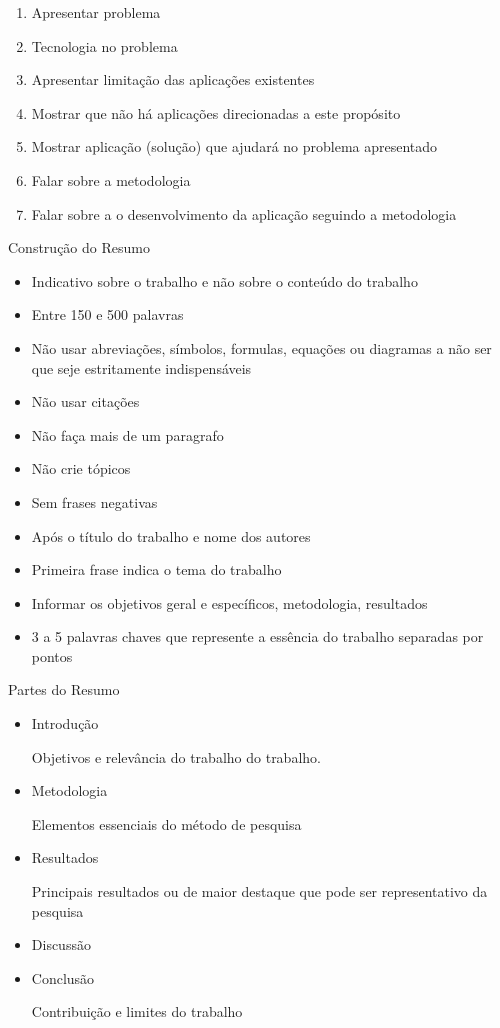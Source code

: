 \begin{enumerate}
\item Apresentar problema
\item Tecnologia no problema
\item Apresentar limitação das aplicações existentes
\item Mostrar que não há aplicações direcionadas a este propósito
\item Mostrar aplicação (solução) que ajudará no problema apresentado
\item Falar sobre a metodologia
\item Falar sobre a o desenvolvimento da aplicação seguindo a metodologia
\end{enumerate}


\newpage
{\fontsize{17}{0}\selectfont Construção do Resumo}
\begin{itemize}
\item Indicativo sobre o trabalho e não sobre o conteúdo do trabalho
\item Entre 150 e 500 palavras
\item Não usar abreviações, símbolos, formulas, equações ou diagramas a não ser que seje estritamente indispensáveis
\item Não usar citações
\item Não faça mais de um paragrafo
\item Não crie tópicos
\item Sem frases negativas
\item Após o título do trabalho e nome dos autores
\item Primeira frase indica o tema do trabalho
\item Informar os objetivos geral e específicos, metodologia, resultados 
\item 3 a 5 palavras chaves que represente a essência do trabalho separadas por pontos
\end{itemize}

{\fontsize{17}{0}\selectfont Partes do Resumo}
\begin{itemize}
\item Introdução

Objetivos e relevância do trabalho do trabalho. 
\item Metodologia

Elementos essenciais do método de pesquisa
\item Resultados

Principais resultados ou de maior destaque que pode ser representativo da pesquisa
\item Discussão
\item Conclusão

Contribuição e limites do trabalho
\end{itemize}

